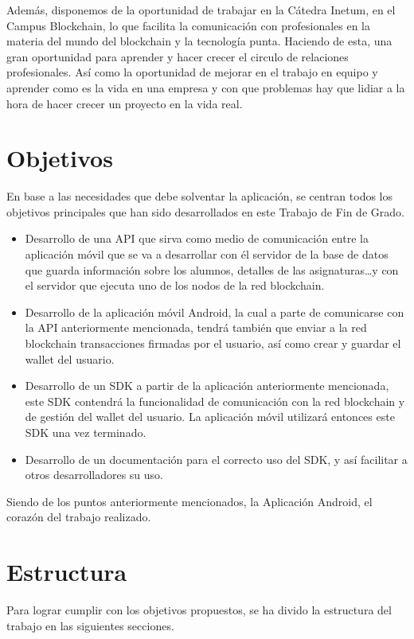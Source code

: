 Además, disponemos de la oportunidad de trabajar en la Cátedra Inetum, en el Campus Blockchain, lo que facilita la comunicación con profesionales en la materia del mundo del blockchain y la tecnología punta. Haciendo de esta, una gran oportunidad para aprender y hacer crecer el circulo de relaciones profesionales. Así como la oportunidad de mejorar en el trabajo en equipo y aprender como es la vida en una empresa y con que problemas hay que lidiar a la hora de hacer crecer un proyecto en la vida real.

\section{Objetivos}

En base a las necesidades que debe solventar la aplicación, se centran todos los objetivos principales que han sido desarrollados en este Trabajo de Fin de Grado.
\begin{itemize}
\item Desarrollo de una API que sirva como medio de comunicación entre la aplicación móvil que se va a desarrollar con él servidor de la base de datos que guarda información sobre los alumnos, detalles de las asignaturas\dots y con el servidor que ejecuta uno de los nodos de la red blockchain. 
\item Desarrollo de la aplicación móvil Android, la cual a parte de comunicarse con la API anteriormente mencionada, tendrá también que enviar a la red blockchain transacciones firmadas por el usuario, así como crear y guardar el wallet del usuario. 
\item Desarrollo de un SDK a partir de la aplicación anteriormente mencionada, este SDK contendrá la funcionalidad de comunicación con la red blockchain y de gestión del wallet del usuario. La aplicación móvil utilizará entonces este SDK una vez terminado. 
\item Desarrollo de un documentación para el correcto uso del SDK, y así facilitar a otros desarrolladores su uso.
\end{itemize}
Siendo de los puntos anteriormente mencionados, la Aplicación Android, el corazón del trabajo realizado.

\section{Estructura}
Para lograr cumplir con los objetivos propuestos, se ha divido la estructura del trabajo en las siguientes secciones. \\

